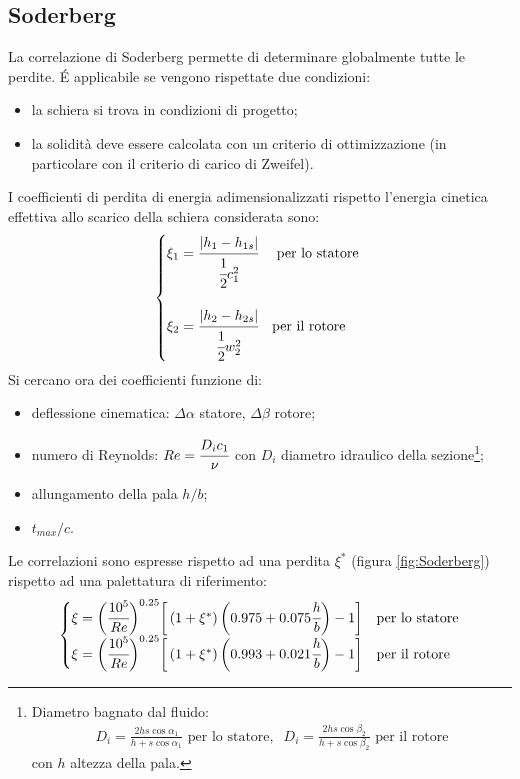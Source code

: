 \subsection{Soderberg}
La correlazione di Soderberg permette di determinare globalmente tutte le perdite. \'E applicabile se vengono rispettate due condizioni:
\begin{itemize}
	\item la schiera si trova in condizioni di progetto;
	\item la solidità deve essere calcolata con un criterio di ottimizzazione (in particolare con il criterio di carico di Zweifel).
\end{itemize}
I coefficienti di perdita di energia adimensionalizzati rispetto l'energia cinetica effettiva allo scarico della schiera considerata sono:
\begin{align*}
\begin{cases}
\xi_1 = \cfrac{|h_1 - h_{1s}|}{\cfrac{1}{2} c_1^2} & \mbox{ per lo statore }\\
\\
\xi_2 = \cfrac{|h_2 - h_{2s}|}{\cfrac{1}{2} w_2^2} & \mbox{per il rotore }
\end{cases}
\end{align*}
Si cercano ora dei coefficienti funzione di:
\begin{itemize}
\item deflessione cinematica: $\Delta \alpha$ statore, $\Delta \beta$ rotore;
\item numero di Reynolds: $Re = \cfrac{D_i c_1}{\nu}$
con $D_i$ diametro idraulico della sezione\footnote{Diametro bagnato dal fluido: \begin{align*}
D_{i} = \frac{2 h s \cos \alpha_1}{h + s \cos \alpha_1} \mbox{ per lo statore}, \;\; D_{i} = \frac{2 h s \cos \beta_2}{h + s \cos \beta_2} \mbox{ per il rotore}
\end{align*} con $h$ altezza della pala.};
\item allungamento della pala $h/b$;
\item $t_{max}/c$.
\end{itemize}
Le correlazioni sono espresse rispetto ad una perdita $\xi^*$ (figura \ref{fig:Soderberg}) rispetto ad una palettatura di riferimento:
\begin{align*}
\begin{cases}
\xi = \bigg( \cfrac{10^5}{Re} \bigg)^{0.25} \bigg[ \left( 1 + \xi^* \right) \bigg ( 0.975 + 0.075 \cfrac{h}{b} \bigg) -1 \bigg] & \mbox{per lo statore} \\
\xi = \bigg( \cfrac{10^5}{Re} \bigg)^{0.25} \bigg[ \left( 1 + \xi^* \right) \bigg ( 0.993 + 0.021 \cfrac{h}{b} \bigg) -1 \bigg] & \mbox{per il rotore}
\end{cases}
\end{align*}
